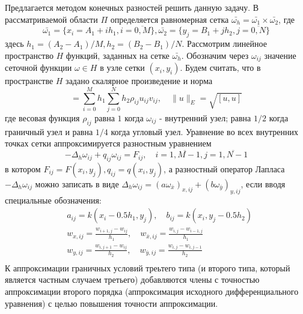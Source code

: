 \documentclass{article}
\begin{document}
Предлагается методом конечных разностей решить данную задачу. В рассматриваемой области $\Pi$ определяется равномерная сетка $\bar{\omega_h} = \bar{\omega_1} \times \bar{\omega_2}$, где
\begin{equation*}
    \bar{\omega_1} = \{x_i = A_1 + ih_1, i=\overline{0,M} \}, \bar{\omega_2} = \{y_j= B_1 + jh_2, j=\overline{0,N} \}
\end{equation*}
здесь $h_1 = (A_2 - A_1)/M, h_2 = (B_2-B_1)/N$. Рассмотрим линейное пространство $H$ функций, заданных на сетке $\bar{\omega_h}$. Обозначим через $\omega_{ij}$ значение сеточной функции $\omega\in H$ в узле сетки $(x_i, y_i)$. Будем считать, что в пространстве $H$ задано скалярное произведение и норма
\begin{equation*}
    [u,v] = \sum_{i=0}^{M} h_1 \sum_{j=0}^{N} h_2\rho_{ij}u_{ij}v_{ij}, \quad \|u\|_E = \sqrt{[u,u]}
\end{equation*}
где весовая функция $\rho_{ij}$ равна $1$ когда $\omega_{ij}$ - внутренний узел; равна $1/2$ когда граничный узел и равна $1/4$ когда угловый узел. Уравнение во всех внутренних точках сетки аппроксимируется разностным уравнением
\begin{equation*}
    -\Delta_h \omega_{ij} + q_{ij}\omega_{ij} = F_{ij}, \quad i=\overline{1,M-1}, j=\overline{1,N-1}
\end{equation*}
в котором $F_{ij} = F(x_i, y_j), q_{ij} = q(x_i, y_j)$, а разностный оператор Лапласа $-\Delta_{h}\omega_{ij}$ можно записать в виде $\Delta_h\omega_{ij}=(a\omega_{\bar{x}})_{x,ij} + (b\omega_{\bar{y}})_{y,ij}$, если вводя специальные обозначения:
\begin{equation*}
\begin{aligned}
    & a_{ij} = k(x_i - 0.5h_1, y_j),\quad b_{ij} = k(x_i, y_j - 0.5h_2) \\
    & w_{x,ij} = \frac{w_{i+1,j} - w_{ij}}{h_1},\quad w_{\bar{x},ij} = \frac{w_{i,j} - w_{i-1,j}}{h_1} \\
    & w_{y,ij} = \frac{w_{i,j+1} - w_{ij}}{h_2},\quad w_{\bar{y},ij} = \frac{w_{i,j} - w_{i,j-1}}{h_2} \\
\end{aligned}
\end{equation*}
К аппроксимации граничных условий треьтего типа (и второго типа, который является частным случаем третьего) добавляются члены с точностью аппроксимации второго порядка (аппроксимация исходного дифференциального уравнения) с целью повышения точности аппроксимации.
\end{document}
